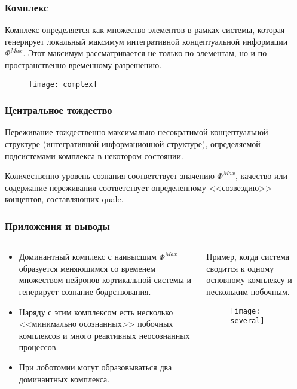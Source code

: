 \documentclass[default]{beamer}
\begin{document}
	\begin{frame}
		\frametitle{Комплекс}
		
		Комплекс определяется как множество элементов в рамках системы, которая генерирует локальный максимум интегративной концептуальной информации $\Phi^{Max}$. Этот максимум рассматривается не только по элементам, но и по пространственно-временному разрешению.
		\begin{figure}
			\texttt{[image: complex]}
		\end{figure}
	\end{frame}	
	
	\begin{frame}
		\frametitle{Центральное тождество}
		
		Переживание тождественно максимально несократимой концептуальной структуре (интегративной информационной структуре), определяемой подсистемами комплекса в некотором состоянии.
		\par\bigskip
		Количественно уровень сознания соответствует значению $\Phi^{Max}$, качество или содержание переживания соответствует определенному <<созвездию>> концептов, составляющих quale.
	\end{frame}	
		
	\begin{frame}
		\frametitle{Приложения и выводы}
		
		\begin{columns}
			\begin{column}{0.53\textwidth}
				\begin{itemize}
					\item Доминантный комплекс с наивысшим $\Phi^{Max}$ образуется меняющимся со временем множеством нейронов кортикальной системы и генерирует сознание бодрствования. 
					\item Наряду с этим комплексом есть несколько <<минимально осознанных>> побочных комплексов и много реактивных неосознанных процессов.
					\item При лоботомии могут образовываться два доминантных комплекса.
				\end{itemize}
				
			\end{column}
			\begin{column}{0.47\textwidth}
				Пример, когда система сводится к одному основному комплексу и нескольким побочным.
				\begin{figure}
					\texttt{[image: several]}
				\end{figure}
			\end{column}
		\end{columns}
		
	\end{frame}
				
\end{document}
